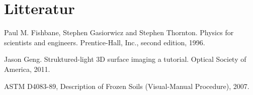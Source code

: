 \chapter{Litteratur}
Paul M. Fishbane, Stephen Gasiorwicz and Stephen Thornton. Physics for scientists and engineers. Prentice-Hall, Inc., second edition, 1996.

\noindent Jason Geng. Struktured-light 3D surface imaging a tutorial. Optical Society of America, 2011.

\noindent ASTM D4083-89, Description of Frozen Soils (Visual-Manual Procedure), 2007.